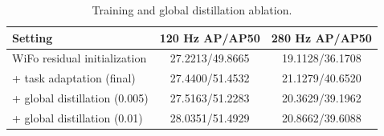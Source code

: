 \begin{table}[t]
\centering
\caption{Training and global distillation ablation.}
\label{tab:training_ablation}
\begin{tabular}{l|cc}
\hline
Setting & 120 Hz AP/AP50 & 280 Hz AP/AP50 \\
\hline
WiFo residual initialization & 27.2213/49.8665 & 19.1128/36.1708 \\ 
+ task adaptation (final) & 27.4400/51.4532 & 21.1279/40.6520 \\ 
+ global distillation (0.005) & 27.5163/51.2283 & 20.3629/39.1962 \\ 
+ global distillation (0.01) & 28.0351/51.4929 & 20.8662/39.6088 \\ 
\hline
\end{tabular}
\end{table}
